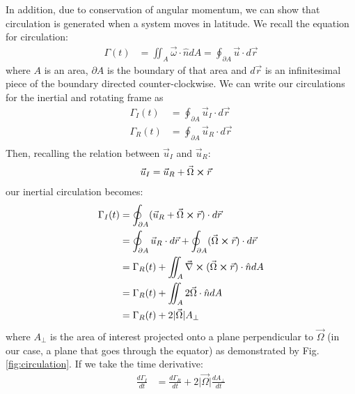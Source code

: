 In addition, due to conservation of angular momentum, we can show that circulation is generated when a system moves in latitude. We recall the equation for circulation:
\begin{align}
    \label{eqn:circulation}
    \Gamma (t) &= \iint_A \vec{\omega}\cdot \hat{n}dA = \oint_{\partial A} \vec{u}\cdot d\vec{r}
\end{align}
where $A$ is an area, $\partial A$ is the boundary of that area and $d\vec{r}$ is an infinitesimal piece of the boundary directed counter-clockwise. We can write our circulations for the inertial and rotating frame as
\begin{align}
    \label{eqn:incirc}
    \Gamma_I(t) &= \oint_{\partial A} \Vec{u}_I\cdot d\Vec{r}\\
    \Gamma_R(t) &= \oint_{\partial A} \Vec{u}_R\cdot d\Vec{r}\\
\end{align}
Then, recalling the relation between $\vec{u}_I$ and $\vec{u}_R$:
\begin{align}
    \label{eqn:inertrot}
    \Vec{u}_I &= \Vec{u}_R+\Vec{\Omega}\cross\Vec{r}
\end{align}
our inertial circulation becomes:
\begin{align*}
    \Gamma_I (t) &= \oint_{\partial A} (\Vec{u}_R+\Vec{\Omega}\cross\Vec{r})\cdot d\Vec{r}\\
     &= \oint_{\partial A} \Vec{u}_R\cdot d\Vec{r}+\oint_{\partial A}(\Vec{\Omega}\cross\vec
    r)\cdot d\Vec{r}\\
     &= \Gamma_R (t)+ \iint_A \Vec{\nabla}\cross(\Vec{\Omega}\cross\Vec{r})\cdot\hat{n}dA\\
     &= \Gamma_R (t) +\iint_A 2\Vec{\Omega}\cdot\hat{n}dA\\
     &= \Gamma_R (t) +2\vert \Vec{\Omega}\vert A_{\perp}
\end{align*}
where $A_{\perp}$ is the area of interest projected onto a plane perpendicular to $\Vec{\Omega}$ (in our case, a plane that goes through the equator) as demonstrated by Fig. \ref{fig:circulation}. If we take the time derivative:
\begin{align*}
    \frac{d\Gamma_I}{dt} &= \frac{d\Gamma_R}{dt}+2\vert \Vec{\Omega}\vert \frac{dA_\perp}{dt}
\end{align*}
